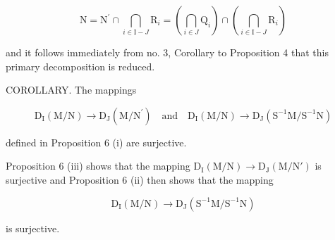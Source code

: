 \[
\mathrm{N} = \mathrm{N} ^ {\prime} \cap \bigcap_ {i \in \mathrm{I} - J} \mathrm{R} _ {i} = \left(\bigcap_ {i \in J} \mathrm{Q} _ {i}\right) \cap \left(\bigcap_ {i \in \mathrm{I} - J} \mathrm{R} _ {i}\right)
\]

and it follows immediately from no. 3, Corollary to Proposition 4 that this primary decomposition is reduced.

COROLLARY. The mappings

\[
\mathrm{D} _ {\mathrm{I}} (\mathrm{M} / \mathrm{N}) \rightarrow \mathrm{D} _ {\mathrm{J}} (\mathrm{M} / \mathrm{N} ^ {\prime}) \quad \text{and} \quad \mathrm{D} _ {\mathrm{I}} (\mathrm{M} / \mathrm{N}) \rightarrow \mathrm{D} _ {\mathrm{J}} (\mathrm{S} ^ {- 1} \mathrm{M} / \mathrm{S} ^ {- 1} \mathrm{N})
\]

defined in Proposition 6 (i) are surjective.

Proposition 6 (iii) shows that the mapping \(\mathrm{D}_{\mathrm{I}}(\mathrm{M}/\mathrm{N}) \rightarrow \mathrm{D}_{\mathrm{J}}(\mathrm{M}/\mathrm{N}')\) is surjective and Proposition 6 (ii) then shows that the mapping

\[
\mathrm{D} _ {\mathrm{I}} (\mathrm{M} / \mathrm{N}) \rightarrow \mathrm{D} _ {\mathrm{J}} (\mathrm{S} ^ {- 1} \mathrm{M} / \mathrm{S} ^ {- 1} \mathrm{N})
\]

is surjective.


